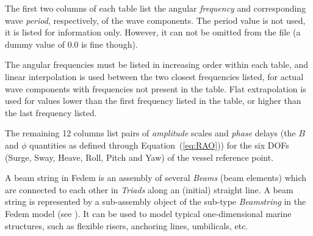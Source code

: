 \noindent{}

The first two columns of each table list the angular {\sl frequency} and
corresponding wave {\sl period}, respectively, of the wave components.
The period value is not used, it is listed for information only. However,
it can not be omitted from the file (a dummy value of 0.0 is fine though).

The angular frequencies must be listed in increasing order within each table,
and linear interpolation is used between the two closest frequencies listed,
for actual wave components with frequencies not present in the table.
Flat extrapolation is used for values lower than the first frequency listed
in the table, or higher than the last frequency listed.

The remaining 12 columns list pairs of {\sl amplitude} scales and {\sl phase}
delays (the $B$ and $\phi$ quantities as defined through
Equation~(\ref{eq:RAO})) for the six DOFs (Surge, Sway, Heave, Roll, Pitch
and Yaw) of the vessel reference point.



A beam string in Fedem is an assembly of several {\sl Beams} (beam elements)
which are connected to each other in {\sl Triads} along an (initial) straight
line. A beam string is represented by a sub-assembly object of the sub-type
{\sl Beamstring} in the Fedem model
(see ).
It can be used to model typical one-dimensional marine structures,
such as flexible risers, anchoring lines, umbilicals, etc.




